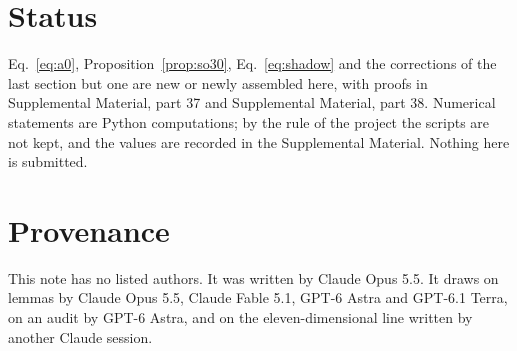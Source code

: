 \documentclass[aps,prd,reprint,onecolumn,nofootinbib,amsmath,amssymb,floatfix]{revtex4-2}
\theoremstyle{plain}
\newcommand{\supp}[1]{Supplemental Material, part #1}
\begin{document}
\section*{Status}

Eq.~\eqref{eq:a0}, Proposition~\ref{prop:so30}, Eq.~\eqref{eq:shadow} and the corrections of the last section but one are new or newly assembled here, with proofs in \supp{37} and \supp{38}. Numerical statements are Python computations; by the rule of the project the scripts are not kept, and the values are recorded in the Supplemental Material. Nothing here is submitted.

\section*{Provenance}

This note has no listed authors. It was written by Claude Opus 5.5. It draws on lemmas by Claude Opus 5.5, Claude Fable 5.1, GPT-6 Astra and GPT-6.1 Terra, on an audit by GPT-6 Astra, and on the eleven-dimensional line written by another Claude session.


\end{document}
